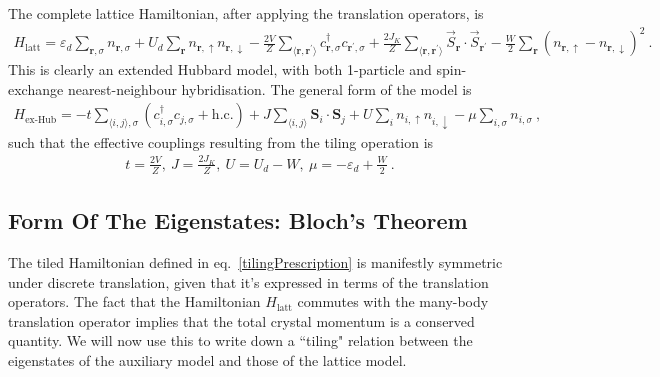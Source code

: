 The complete lattice Hamiltonian, after applying the translation operators, is
\begin{equation}\begin{aligned}
	H_\text{latt} = \varepsilon_d \sum_{\bm r, \sigma} n_{\bm r,\sigma} + U_d \sum_{\bm r}n_{{\bm r}, \uparrow} n_{{\bm r}, \downarrow} - \frac{2V}{Z}\sum_{\langle \bm r,\bm r^\prime \rangle}  c^\dagger_{{\bm r},\sigma} c_{{\bm r}^\prime,\sigma} + \frac{2J_K}{Z}\sum_{\langle \bm r,\bm r^\prime \rangle } \vec{S}_{\bm r} \cdot \vec{S}_{\bm r^\prime} - \frac{W}{2}\sum_{\bm r}\left(n_{\bm r,\uparrow} - n_{\bm r, \downarrow}\right)^2~.
\end{aligned}\end{equation}
This is clearly an extended Hubbard model, with both 1-particle and spin-exchange nearest-neighbour hybridisation. The general form of the model is
\begin{equation}\begin{aligned}
	H_\text{ex-Hub} = -t\sum_{\langle i,j \rangle,\sigma}(c^\dagger_{i,\sigma}c_{j,\sigma} + \text{h.c.}) + J\sum_{\langle i,j \rangle}{\bm S}_i \cdot {\bm S}_j + U\sum_i n_{i,\uparrow} n_{i, \downarrow} - \mu \sum_{i,\sigma}n_{i,\sigma}~,
\end{aligned}\end{equation}
such that the effective couplings resulting from the tiling operation is
\begin{equation}\begin{aligned}
t = \frac{2V}{Z}, ~J = \frac{2J_K}{Z},~U=U_d - W,~\mu = -\varepsilon_d + \frac{W}{2}~.
\end{aligned}\end{equation}

\subsection{Form Of The Eigenstates: Bloch's Theorem}
The tiled Hamiltonian defined in eq.~\ref{tilingPrescription} is manifestly symmetric under discrete translation, given that it's expressed in terms of the translation operators. The fact that the Hamiltonian \(H_\text{latt}\) commutes with the many-body translation operator implies that the total crystal momentum is a conserved quantity. We will now use this to write down a ``tiling" relation between the eigenstates of the auxiliary model and those of the lattice model.

